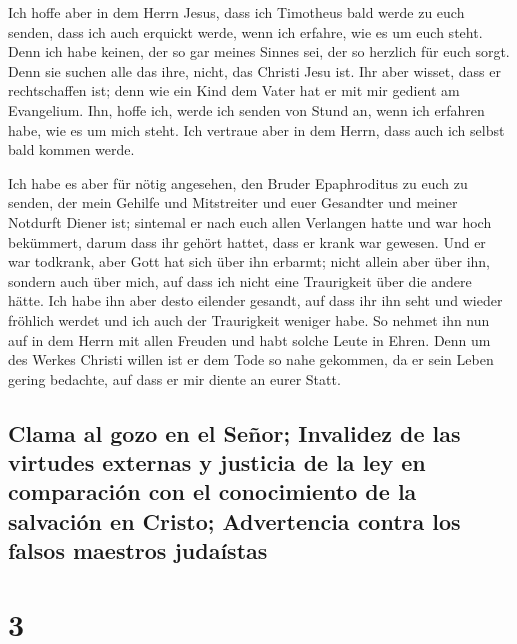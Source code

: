  Ich hoffe aber in dem Herrn Jesus, dass ich Timotheus
bald werde zu euch senden, dass ich auch erquickt werde, wenn ich
erfahre, wie es um euch steht.  Denn ich habe keinen, der
so gar meines Sinnes sei, der so herzlich für euch sorgt.
 Denn sie suchen alle das ihre, nicht, das Christi Jesu
ist.  Ihr aber wisset, dass er rechtschaffen ist; denn
wie ein Kind dem Vater hat er mit mir gedient am Evangelium.
 Ihn, hoffe ich, werde ich senden von Stund an, wenn ich
erfahren habe, wie es um mich steht.  Ich vertraue aber
in dem Herrn, dass auch ich selbst bald kommen werde.

 Ich habe es aber für nötig angesehen, den Bruder
Epaphroditus zu euch zu senden, der mein Gehilfe und Mitstreiter und
euer Gesandter und meiner Notdurft Diener ist;  sintemal
er nach euch allen Verlangen hatte und war hoch bekümmert, darum dass
ihr gehört hattet, dass er krank war gewesen.  Und er war
todkrank, aber Gott hat sich über ihn erbarmt; nicht allein aber über
ihn, sondern auch über mich, auf dass ich nicht eine Traurigkeit über
die andere hätte.  Ich habe ihn aber desto eilender
gesandt, auf dass ihr ihn seht und wieder fröhlich werdet und ich auch
der Traurigkeit weniger habe.  So nehmet ihn nun auf in
dem Herrn mit allen Freuden und habt solche Leute in Ehren.
 Denn um des Werkes Christi willen ist er dem Tode so
nahe gekommen, da er sein Leben gering bedachte, auf dass er mir diente
an eurer Statt.

\hypertarget{clama-al-gozo-en-el-seuxf1or-invalidez-de-las-virtudes-externas-y-justicia-de-la-ley-en-comparaciuxf3n-con-el-conocimiento-de-la-salvaciuxf3n-en-cristo-advertencia-contra-los-falsos-maestros-judauxedstas}{%
\subsection{Clama al gozo en el Señor; Invalidez de las virtudes
externas y justicia de la ley en comparación con el conocimiento de la
salvación en Cristo; Advertencia contra los falsos maestros
judaístas}\label{clama-al-gozo-en-el-seuxf1or-invalidez-de-las-virtudes-externas-y-justicia-de-la-ley-en-comparaciuxf3n-con-el-conocimiento-de-la-salvaciuxf3n-en-cristo-advertencia-contra-los-falsos-maestros-judauxedstas}}

\hypertarget{section-2}{%
\section{3}\label{section-2}}

